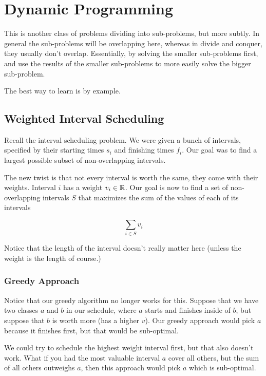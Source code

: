 \documentclass[12pt]{article}
\begin{document}
  \newpage
  \section{Dynamic Programming}

  This is another class of problems dividing into sub-problems, but more subtly.
  In general the sub-problems will be overlapping here, whereas in divide and
  conquer, they usually don't overlap. Essentially, by solving the smaller
  sub-problems first, and use the results of the smaller sub-problems to more
  easily solve the bigger sub-problem.

  The best way to learn is by example.

  \subsection{Weighted Interval Scheduling}

  Recall the interval scheduling problem. We were given a bunch of intervals,
  specified by their starting times $s_i$ and finishing times $f_i$. Our goal
  was to find a largest possible subset of non-overlapping intervals.

  The new twist is that not every interval is worth the same, they come with
  their weights. Interval $i$ has a weight $v_i \in {\mathbb R}$. Our goal is now to
  find a set of non-overlapping intervals $S$ that maximizes the sum of the
  values of each of its intervals

  \[
    \sum_{i \in S} v_i
  \]

  Notice that the length of the interval doesn't really matter here (unless the
  weight is the length of course.)

  \subsubsection{Greedy Approach}

  Notice that our greedy algorithm no longer works for this. Suppose that we
  have two classes $a$ and $b$ in our schedule, where $a$ starts and finishes
  inside of $b$, but suppose that $b$ is worth more (has a higher $v$). Our
  greedy approach would pick $a$ because it finishes first, but that would be
  sub-optimal.

  We could try to schedule the highest weight interval first, but that also
  doesn't work. What if you had the most valuable interval $a$ cover all others,
  but the sum of all others outweighs $a$, then this approach would pick $a$
  which is sub-optimal.
\end{document}
